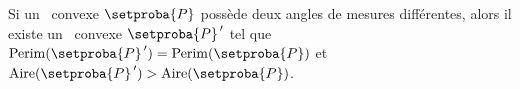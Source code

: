 %
%
%	
%
%
%
%
%
%
\begin{fact} \label{almost-reg-poly}
	Si un \niso\ convexe $\setproba{P}$ possède deux angles de mesures différentes,
	alors il existe un \ngone\ convexe $\setproba{P}^{\,\prime}$ tel que
	$\perim{\setproba{P}^{\,\prime}} = \perim{\setproba{P}}$ 
	et 
	$\area{\setproba{P}^{\,\prime}} > \area{\setproba{P}}$.
\end{fact}


